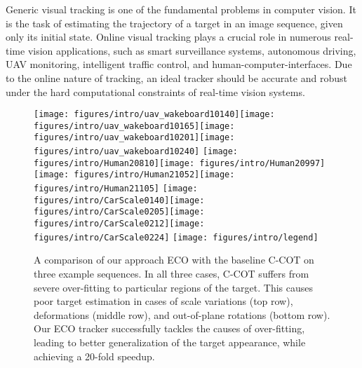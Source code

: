 \documentclass[10pt,twocolumn,letterpaper]{article}
\begin{document}
Generic visual tracking is one of the fundamental problems in computer vision. It is the task of estimating the trajectory of a target in an image sequence, given only its initial state. Online visual tracking plays a crucial role in numerous real-time vision applications, such as smart surveillance systems, autonomous driving, UAV monitoring, intelligent traffic control, and human-computer-interfaces. Due to the online nature of tracking, an ideal tracker should be accurate and robust under the hard computational constraints of real-time vision systems.

\begin{figure}[!t]
	\centering \newcommand{\wid}{0.25\columnwidth}\texttt{[image: figures/intro/uav\_wakeboard10140]}\texttt{[image: figures/intro/uav\_wakeboard10165]}\texttt{[image: figures/intro/uav\_wakeboard10201]}\texttt{[image: figures/intro/uav\_wakeboard10240]}
	\texttt{[image: figures/intro/Human20810]}\texttt{[image: figures/intro/Human20997]}\texttt{[image: figures/intro/Human21052]}\texttt{[image: figures/intro/Human21105]}
	\texttt{[image: figures/intro/CarScale0140]}\texttt{[image: figures/intro/CarScale0205]}\texttt{[image: figures/intro/CarScale0212]}\texttt{[image: figures/intro/CarScale0224]}
	\texttt{[image: figures/intro/legend]}\vspace{-1mm}\caption{A comparison of our approach ECO with the baseline C-COT \cite{DanelljanECCV2016} on three example sequences. In all three cases, C-COT suffers from severe over-fitting to particular regions of the target. This causes poor target estimation in cases of scale variations (top row), deformations (middle row), and out-of-plane rotations (bottom row). Our ECO tracker successfully tackles the causes of over-fitting, leading to better generalization of the target appearance, while achieving a 20-fold speedup.}\vspace{-2.5mm}\label{fig:intro}\end{figure}
\end{document}

